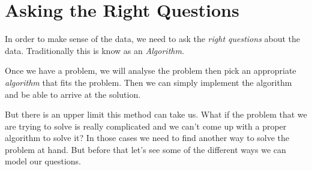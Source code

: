 \documentclass[../../main]{subfiles}
\begin{document}
\section{Asking the Right Questions} \label{sec:}

In order to make sense of the data, we need to ask the \emph{right questions}
about the data. Traditionally this is know as an \emph{Algorithm}.

%
%

Once we have a problem, we will analyse the problem then pick an appropriate
\emph{algorithm} that fits the problem. Then we can simply implement the
algorithm and be able to arrive at the solution.

But there is an upper limit this method can take us. What if the problem
that we are trying to solve is really complicated and we can't come up
with a proper algorithm to solve it? In those cases we need to find another
way to solve the problem at hand. But before that let's see some of the
different ways we can model our questions.
\end{document}
